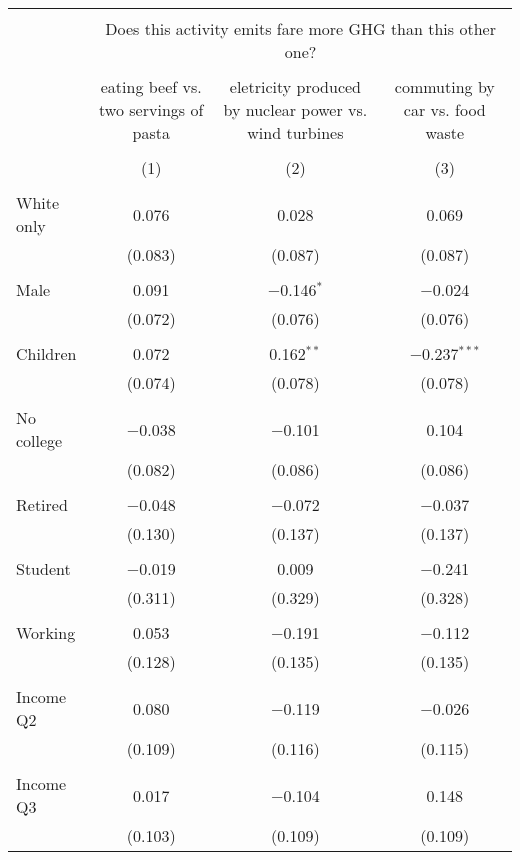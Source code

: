 
\begin{tabular}{@{\extracolsep{5pt}}lccc} 
\\[-1.8ex]\hline 
\hline \\[-1.8ex] 
 & \multicolumn{3}{c}{Does this activity emits fare more GHG than this other one?} \\ 
\cline{2-4} 
\\[-1.8ex] & eating beef vs. two servings of pasta & eletricity produced by nuclear power vs. wind turbines & commuting by car vs. food waste \\ 
\\[-1.8ex] & (1) & (2) & (3)\\ 
\hline \\[-1.8ex] 
 White only & 0.076 & 0.028 & 0.069 \\ 
  & (0.083) & (0.087) & (0.087) \\ 
  & & & \\ 
 Male & 0.091 & $-$0.146$^{*}$ & $-$0.024 \\ 
  & (0.072) & (0.076) & (0.076) \\ 
  & & & \\ 
 Children & 0.072 & 0.162$^{**}$ & $-$0.237$^{***}$ \\ 
  & (0.074) & (0.078) & (0.078) \\ 
  & & & \\ 
 No college & $-$0.038 & $-$0.101 & 0.104 \\ 
  & (0.082) & (0.086) & (0.086) \\ 
  & & & \\ 
 Retired & $-$0.048 & $-$0.072 & $-$0.037 \\ 
  & (0.130) & (0.137) & (0.137) \\ 
  & & & \\ 
 Student & $-$0.019 & 0.009 & $-$0.241 \\ 
  & (0.311) & (0.329) & (0.328) \\ 
  & & & \\ 
 Working & 0.053 & $-$0.191 & $-$0.112 \\ 
  & (0.128) & (0.135) & (0.135) \\ 
  & & & \\ 
 Income Q2 & 0.080 & $-$0.119 & $-$0.026 \\ 
  & (0.109) & (0.116) & (0.115) \\ 
  & & & \\ 
 Income Q3 & 0.017 & $-$0.104 & 0.148 \\ 
  & (0.103) & (0.109) & (0.109) \\ 

\end{tabular}
